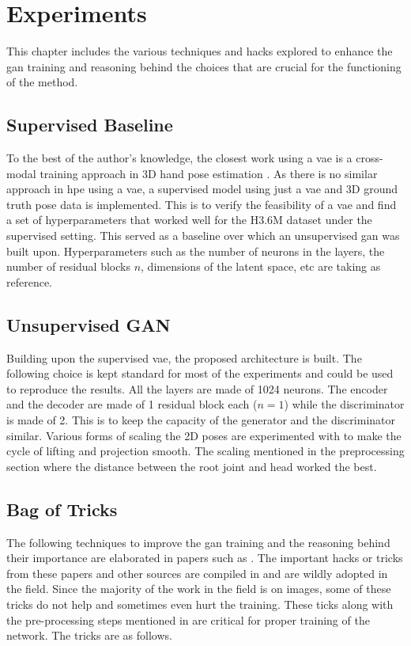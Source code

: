 \chapter{Experiments}
\label{chap:experiments}
This chapter includes the various techniques and hacks explored to enhance the \ac{gan} training and reasoning behind the choices that are crucial for the functioning of the method.%

\section{Supervised Baseline}
To the best of the author's knowledge, the closest work using a \ac{vae} is a cross-modal training approach in 3D hand pose estimation \cite{crossmodal}. As there is no similar approach in \ac{hpe} using a \ac{vae}, a supervised model using just a \ac{vae} and 3D ground truth pose data is implemented. This is to verify the feasibility of a \ac{vae} and find a set of hyperparameters that worked well for the H3.6M dataset under the supervised setting. This served as a baseline over which an unsupervised \ac{gan} was built upon. Hyperparameters such as the number of neurons in the layers, the number of residual blocks $n$, dimensions of the latent space, etc are taking as reference.

\section{Unsupervised GAN}
Building upon the supervised \ac{vae}, the proposed architecture is built. The following choice is kept standard for most of the experiments and could be used to reproduce the results. All the layers are made of 1024 neurons. The encoder and the decoder are made of 1 residual block each ($n = 1$) while the discriminator is made of 2. This is to keep the capacity of the generator and the discriminator similar. Various forms of scaling the 2D poses are experimented with to make the cycle of lifting and projection smooth. The scaling mentioned in the preprocessing section where the distance between the root joint and head worked the best. %

\section{Bag of Tricks}
\label{sec:bag_of_tricks}
The following techniques to improve the \ac{gan} training and the reasoning behind their importance are elaborated in papers such as \cite{soumith2017wasserstein,goodfellow2014generative,openaigan2wgan,improved_gan}. The important hacks or tricks from these papers and other sources are compiled in \cite{gan_hacks} and are wildly adopted in the field. Since the majority of the work in the field is on images, some of these tricks do not help and sometimes even hurt the training. These ticks along with the pre-processing steps mentioned in  are critical for proper training of the network. The tricks are as follows. %
 
